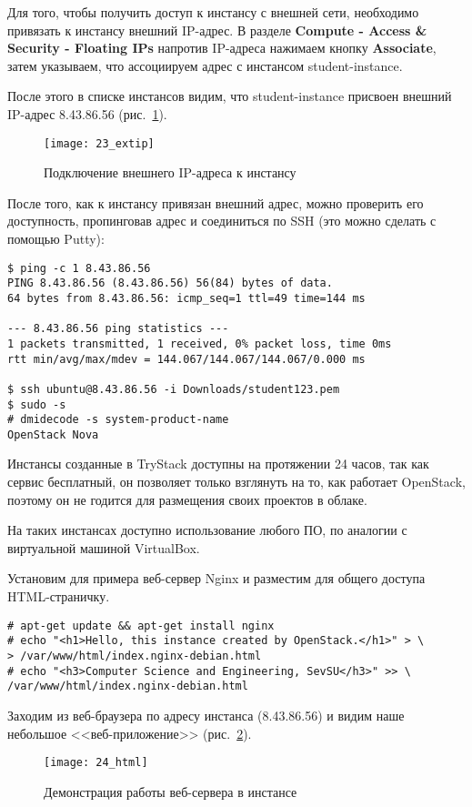 \clearpage

Для того, чтобы получить доступ к инстансу с внешней сети, необходимо привязать к инстансу внешний IP-адрес.
В разделе \textbf{Compute - Access \& Security - Floating IPs} напротив IP-адреса нажимаем кнопку \textbf{Associate}, затем указываем, что ассоциируем адрес с инстансом student-instance.

После этого в списке инстансов видим, что student-instance присвоен внешний IP-адрес 8.43.86.56 (рис.~\ref{pic:extip}).
\begin{figure}[ht]
    \centering
    \texttt{[image: 23\_extip]}
    \caption{Подключение внешнего IP-адреса к инстансу}\label{pic:extip}
\end{figure}

После того, как к инстансу привязан внешний адрес, можно проверить его доступность, пропинговав адрес и соединиться по SSH (это можно сделать с помощью Putty):
\begin{lstlisting}
$ ping -c 1 8.43.86.56
PING 8.43.86.56 (8.43.86.56) 56(84) bytes of data.
64 bytes from 8.43.86.56: icmp_seq=1 ttl=49 time=144 ms

--- 8.43.86.56 ping statistics ---
1 packets transmitted, 1 received, 0% packet loss, time 0ms
rtt min/avg/max/mdev = 144.067/144.067/144.067/0.000 ms

$ ssh ubuntu@8.43.86.56 -i Downloads/student123.pem
$ sudo -s
# dmidecode -s system-product-name
OpenStack Nova
\end{lstlisting}

Инстансы созданные в TryStack доступны на протяжении 24 часов, так как сервис бесплатный, он позволяет только взглянуть на то, как работает OpenStack, поэтому он не годится для размещения своих проектов в облаке.

На таких инстансах доступно использование любого ПО, по аналогии с виртуальной машиной VirtualBox.

Установим для примера веб-сервер Nginx и разместим для общего доступа HTML-страничку.
\begin{lstlisting}
# apt-get update && apt-get install nginx
# echo "<h1>Hello, this instance created by OpenStack.</h1>" > \
> /var/www/html/index.nginx-debian.html
# echo "<h3>Computer Science and Engineering, SevSU</h3>" >> \
/var/www/html/index.nginx-debian.html
\end{lstlisting}

Заходим из веб-браузера по адресу инстанса (8.43.86.56) и видим наше небольшое <<веб-приложение>> (рис.~\ref{pic:html}).
\begin{figure}[ht]
    \centering
    \texttt{[image: 24\_html]}
    \caption{Демонстрация работы веб-сервера в инстансе}\label{pic:html}
\end{figure}

\clearpage
